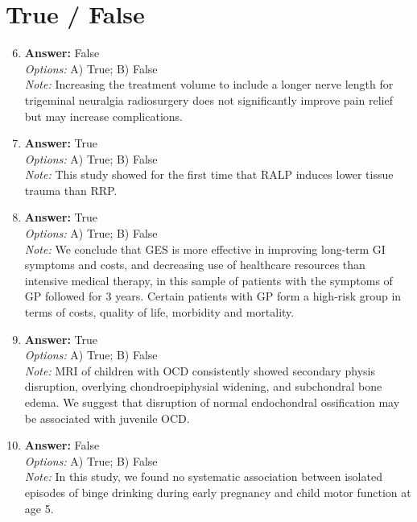 \documentclass[12pt]{article}
\begin{document}
\section*{True / False}
\begin{enumerate}[label=\arabic*.]
\setcounter{enumi}{5}
\item \textbf{Answer:} False
\\ \textit{Options:} A) True; B) False
\\ \textit{Note:} Increasing the treatment volume to include a longer nerve length for trigeminal neuralgia radiosurgery does not significantly improve pain relief but may increase complications.
\item \textbf{Answer:} True
\\ \textit{Options:} A) True; B) False
\\ \textit{Note:} This study showed for the first time that RALP induces lower tissue trauma than RRP.
\item \textbf{Answer:} True
\\ \textit{Options:} A) True; B) False
\\ \textit{Note:} We conclude that GES is more effective in improving long-term GI symptoms and costs, and decreasing use of healthcare resources than intensive medical therapy, in this sample of patients with the symptoms of GP followed for 3 years. Certain patients with GP form a high-risk group in terms of costs, quality of life, morbidity and mortality.
\item \textbf{Answer:} True
\\ \textit{Options:} A) True; B) False
\\ \textit{Note:} MRI of children with OCD consistently showed secondary physis disruption, overlying chondroepiphysial widening, and subchondral bone edema. We suggest that disruption of normal endochondral ossification may be associated with juvenile OCD.
\item \textbf{Answer:} False
\\ \textit{Options:} A) True; B) False
\\ \textit{Note:} In this study, we found no systematic association between isolated episodes of binge drinking during early pregnancy and child motor function at age 5.
\end{enumerate}
\end{document}
